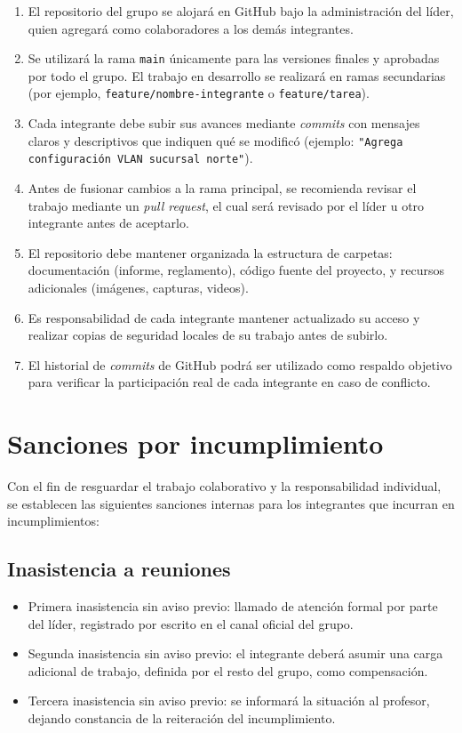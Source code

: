 \documentclass[11pt,a4paper]{article}
\begin{document}
\begin{enumerate}[label=\arabic*.]
    \item El repositorio del grupo se alojar\'a en GitHub bajo la administraci\'on del l\'ider, quien agregar\'a como colaboradores a los demás integrantes.
    \item Se utilizar\'a la rama \texttt{main} \'unicamente para las versiones finales y aprobadas por todo el grupo. El trabajo en desarrollo se realizar\'a en ramas secundarias (por ejemplo, \texttt{feature/nombre-integrante} o \texttt{feature/tarea}).
    \item Cada integrante debe subir sus avances mediante \textit{commits} con mensajes claros y descriptivos que indiquen qu\'e se modific\'o (ejemplo: \texttt{"Agrega configuraci\'on VLAN sucursal norte"}).
    \item Antes de fusionar cambios a la rama principal, se recomienda revisar el trabajo mediante un \textit{pull request}, el cual ser\'a revisado por el l\'ider u otro integrante antes de aceptarlo.
    \item El repositorio debe mantener organizada la estructura de carpetas: documentaci\'on (informe, reglamento), c\'odigo fuente del proyecto, y recursos adicionales (im\'agenes, capturas, videos).
    \item Es responsabilidad de cada integrante mantener actualizado su acceso y realizar copias de seguridad locales de su trabajo antes de subirlo.
    \item El historial de \textit{commits} de GitHub podr\'a ser utilizado como respaldo objetivo para verificar la participaci\'on real de cada integrante en caso de conflicto.
\end{enumerate}

\section{Sanciones por incumplimiento}

Con el fin de resguardar el trabajo colaborativo y la responsabilidad individual, se establecen las siguientes sanciones internas para los integrantes que incurran en incumplimientos:

\subsection{Inasistencia a reuniones}

\begin{itemize}[label=--]
    \item Primera inasistencia sin aviso previo: llamado de atenci\'on formal por parte del l\'ider, registrado por escrito en el canal oficial del grupo.
    \item Segunda inasistencia sin aviso previo: el integrante deber\'a asumir una carga adicional de trabajo, definida por el resto del grupo, como compensaci\'on.
    \item Tercera inasistencia sin aviso previo: se informar\'a la situaci\'on al profesor, dejando constancia de la reiteraci\'on del incumplimiento.
\end{itemize}
\end{document}

